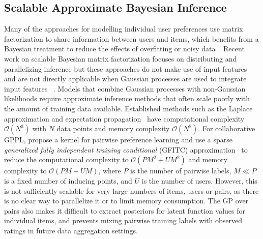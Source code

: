 \subsection{Scalable Approximate Bayesian Inference}

Many of the approaches for modelling individual user preferences use matrix factorization 
to share information between users and items,
which benefits from a Bayesian treatment to reduce the effects of overfitting or noisy data~\citep{saha2015scalable}.
Recent work on scalable Bayesian matrix factorization focuses on distributing and parallelizing 
 inference but 
 these approaches do not make use of input features 
 and are not directly applicable when Gaussian processes are used to integrate input features
 ~\citep{ahn2015large,saha2015scalable,vander2017distributed,chen2018large}. 
Models that combine Gaussian processes with non-Gaussian likelihoods 
require approximate inference methods that often scale poorly with 
the amount of training data available. 
Established methods such as the Laplace approximation 
and expectation propagation~\citep{rasmussen_gaussian_2006} have
computational complexity $\mathcal{O}(N^3)$ with $N$ data points
 and memory complexity $\mathcal{O}(N^2)$. 
For collaborative GPPL, \citet{houlsby2012collaborative}
propose a  kernel for pairwise 
preference learning and use a sparse
\emph{generalized fully independent training conditional} (GFITC) 
approximation~\citep{snelson2006sparse} to reduce the computational complexity to $\mathcal{O}(PM^2 + UM^2)$ and 
memory complexity to $\mathcal{O}(PM + UM)$,
where $P$ is the number of pairwise labels, $M \ll P$ is a fixed number of inducing points, and $U$ is the number of users.
However, this is not sufficiently scalable
 for very large numbers of items, users or pairs, as there is no clear way to parallelize it or to limit memory consumption.
The GP over pairs also makes it difficult to extract posteriors for latent function values for individual items,
and prevents mixing pairwise training labels
with observed ratings in future data aggregation settings.

